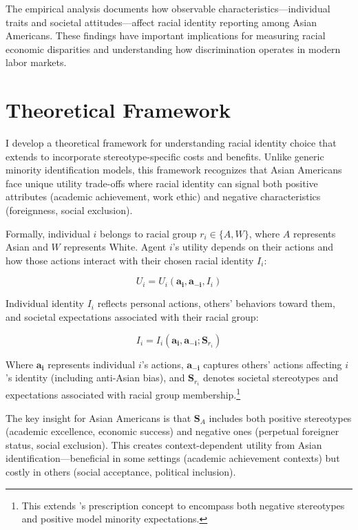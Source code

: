The empirical analysis documents how observable characteristics—individual traits and societal attitudes—affect racial identity reporting among Asian Americans. These findings have important implications for measuring racial economic disparities and understanding how discrimination operates in modern labor markets.

\section{Theoretical Framework}\label{sec:model}

I develop a theoretical framework for understanding racial identity choice that extends \textcite{akerlofEconomicsIdentity2000} to incorporate stereotype-specific costs and benefits. Unlike generic minority identification models, this framework recognizes that Asian Americans face unique utility trade-offs where racial identity can signal both positive attributes (academic achievement, work ethic) and negative characteristics (foreignness, social exclusion).

Formally, individual $i$ belongs to racial group $r_i \in \{A, W\}$, where $A$ represents Asian and $W$ represents White. Agent $i$'s utility depends on their actions and how those actions interact with their chosen racial identity $I_i$:

\begin{equation}
U_i = U_i(\pmb{a_i}, \pmb{a_{-i}}, I_i)\label{eq:util}
\end{equation}

Individual identity $I_i$ reflects personal actions, others' behaviors toward them, and societal expectations associated with their racial group:

\begin{equation}
I_i = I_i(\pmb{a_i}, \pmb{a_{-i}}; \pmb{S}_{r_{i}})\label{eq:identity}
\end{equation}

Where $\pmb{a_i}$ represents individual $i$'s actions, $\pmb{a_{-i}}$ captures others' actions affecting $i$'s identity (including anti-Asian bias), and $\pmb{S}_{r_{i}}$ denotes societal stereotypes and expectations associated with racial group membership.\footnote{This extends \textcite{akerlofEconomicsIdentity2000}'s prescription concept to encompass both negative stereotypes and positive model minority expectations.}

The key insight for Asian Americans is that $\pmb{S}_{A}$ includes both positive stereotypes (academic excellence, economic success) and negative ones (perpetual foreigner status, social exclusion). This creates context-dependent utility from Asian identification—beneficial in some settings (academic achievement contexts) but costly in others (social acceptance, political inclusion).

